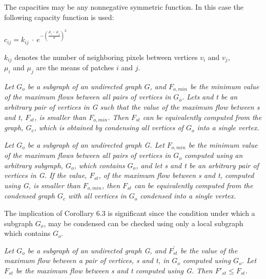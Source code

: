             The capacities may be any nonnegative symmetric function. In this case the following capacity function is used: \\
            \begin{center}
                $c_{ij} = k_{ij} \ \cdot \ e^{-(\frac{\mu_i - \mu_j}{\sigma})^2}$
            \end{center} 

            \noindent $k_{ij}$ denotes the number of neighboring pixels between vertices $v_i$ and $v_j$, \\
            $\mu_i$ and $\mu_j$ are the means of patches $i$ and $j$.

            \vspace{5mm}
             \textit {
                Let $G_o$ be a subgraph of an undirected graph $G$, and $F_{o,min}$ be the minimum value of the maximum flows between all pairs of vertices in $G_o$. Lets and t be an arbitrary pair of vertices in G such that the value of the maximum flow between s and t, $F_{st}$, is smaller than $F_{o,min}$. Then $F_{st}$ can be equivalently computed from the graph, $G_c$, which is obtained by condensing all vertices of $G_o$ into a single vertex.
            }

            \vspace{5mm}
             \textit {
                Let $G_o$ be a subgraph of an undirected graph G. Let $F_{o,min}$ be the minimum value of the maximum flows between all pairs of vertices in $G_o$ computed using an arbitrary subgraph, $G_o$, which contains $G_o$, and let s and t be an arbitrary pair of vertices in G. If the value, $F_{st}$, of the maximum flow between s and t, computed using G, is smaller than $F_{o,min}$, then $F_{st}$ can be equivalently computed from the condensed graph $G_c$ with all vertices in $G_o$ condensed into a single vertex.
            }

            \vspace{2mm}
            \noindent The implication of Corollary 6.3 is significant since the condition under which a subgraph $G_o$, may be condensed can be checked using only a local subgraph which contains $G_o$.

            \vspace{5mm}
             \textit {
                Let $G_o$ be a subgraph of an undirected graph G, and $F^{'}_{st}$ be the value of the maximum flow between a pair of vertices, s and t, in $G_o$ computed using $G_o$. Let $F_{st}$ be the maximum flow between s and t computed using G. Then  $F{'}_{st} \leq F_{st}$.
            }

